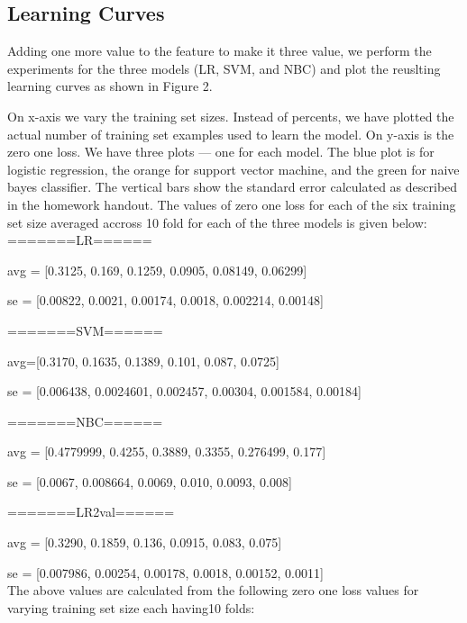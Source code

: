 \documentclass[12pt]{article}
\begin{document}
\subsection{Learning Curves}

Adding one more value to the feature to make it three value, we perform the experiments
for the three models (LR, SVM, and NBC) and plot the reuslting learning curves as shown in
Figure 2.

 On x-axis we vary the training set sizes. Instead of percents, we have plotted the actual
 number of training set examples used to learn the model. On y-axis is the zero one loss. 
We have three plots --- one for each model. The blue plot is for logistic regression, the 
orange for support vector machine, and the green for naive bayes classifier. The vertical 
bars show the standard error calculated as described in the homework handout. The 
values of zero one loss for each of the six training set size averaged accross 10 fold for 
each of the three models is given below:
\\

=======LR======

avg = [0.3125, 0.169, 0.1259, 0.0905, 
0.08149, 0.06299]

se = [0.00822, 0.0021, 
0.00174, 0.0018, 
0.002214, 0.00148]

=======SVM======

avg=[0.3170, 0.1635, 0.1389, 0.101, 
0.087, 0.0725]

se = [0.006438, 0.0024601, 
0.002457, 0.00304, 
0.001584, 0.00184]

=======NBC======

avg = [0.4779999, 0.4255, 0.3889, 0.3355, 
0.276499, 0.177]

se  = [0.0067, 0.008664, 
0.0069, 0.010, 
0.0093, 0.008]

=======LR2val======

avg = [0.3290, 0.1859, 0.136, 0.0915, 
0.083, 0.075]

se = [0.007986, 0.00254, 
0.00178, 0.0018, 
0.00152, 0.0011]
\\

The above values are calculated from the following zero one loss values for varying training
set size each having10 folds:
\\
\end{document}
